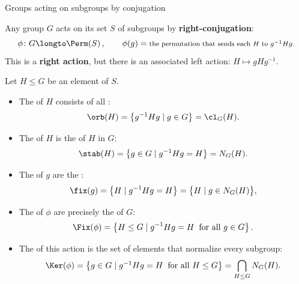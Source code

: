 \documentclass[8pt, handout]{beamer}
\newcommand{\Pause}{}      %
\begin{document}

\begin{frame}{Groups acting on subgroups by conjugation} \smallskip
  
  Any group $G$ acts on its set $S$ of subgroups by
  \textbf{right-conjugation}:
  \[
  \phi\colon G\longto\Perm(S)\,,\qquad
  \phi(g)=\mbox{\footnotesize the permutation that sends each $H$ to
    $g^{-1}Hg$.}
  \]
  \Pause This is a \textbf{right action}, but there is an associated left
  action: $H\mapsto gHg^{-1}$.
  
  \medskip\Pause

  Let $H\leq G$ be an element of $S$. \smallskip\Pause
  \begin{itemize}
  \item The  of $H$ consists of all : %
    \[
    \orb(H)=\big\{g^{-1}Hg\mid g\in G\big\}=\cl_G(H).
    \]
    \vspace{-4mm}\Pause
  \item The  of $H$ is the
     of $H$ in $G$: 
    \[
    \stab(H)=\big\{g\in G\mid g^{-1}Hg=H\big\}=N_G(H).
    \]
    \vspace{-4mm}\Pause
  \item The  of $g$ are the
    :
    \[
    \fix(g)=\big\{H\mid g^{-1}Hg=H\big\}=\big\{H\mid g\in N_G(H)\big\},
    \]
    \vspace{-4mm}\Pause
  \item The  of $\phi$ are precisely the
     of $G$: %
    \[
    \Fix(\phi)=\big\{H\leq G\mid g^{-1}Hg=H\;\;\text{for all }g\in G\big\}\,.
    \]
    \vspace{-4mm}\Pause
  \item The  of this action is the set of elements that
    normalize every subgroup:
    \[
    \begin{array}{c@{\hspace{1mm}}c@{\hspace{1mm}}l}
      \Ker(\phi)
      &=&\big\{g\in G\mid g^{-1}Hg=H\;\;\text{for all }H\leq G\big\}
      \Pause=\displaystyle\bigcap_{H\leq G} N_G(H).
    \end{array}
    \]
  \end{itemize}
  
\end{frame}
\end{document}
